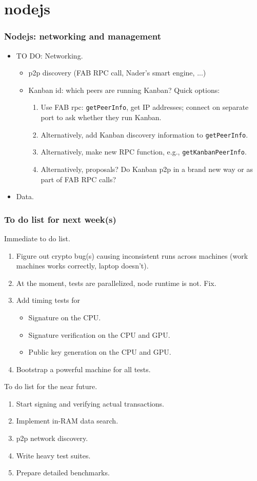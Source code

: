 \section{nodejs}
\begin{frame}[fragile]
\frametitle{Nodejs: networking and management}
\begin{itemize}
\item TO DO: Networking.
\begin{itemize}
\item p2p discovery (FAB RPC call, Nader's smart engine, ...)
\item Kanban id: which peers are running Kanban? Quick options:
\begin{enumerate}
\item Use FAB rpc: \verb|getPeerInfo|, get IP addresses; connect on separate port to ask whether they run Kanban.
\item Alternatively, add Kanban discovery information to \verb|getPeerInfo|.
\item Alternatively, make new RPC function, e.g., \verb|getKanbanPeerInfo|.
\item Alternatively, proposals? Do Kanban p2p in a brand new way or as part of FAB RPC calls?
\end{enumerate}
\end{itemize} 
\item Data.
\end{itemize}
\end{frame}
\begin{frame}
\frametitle{To do list for next week(s)}
Immediate to do list.
\begin{enumerate}
\item Figure out crypto bug(s) causing inconsistent runs across machines (work machines works correctly, laptop doesn't). 
\item At the moment, tests are parallelized, node runtime is not. Fix. 
\item Add timing tests for 
\begin{itemize}
\item Signature on the CPU.
\item Signature verification on the CPU and GPU.
\item Public key generation on the CPU and GPU.
\end{itemize}
\item Bootstrap a powerful machine for all tests.
\end{enumerate}

To do list for the near future.

\begin{enumerate}
\item Start signing and verifying actual transactions.
\item Implement in-RAM data search.
\item p2p network discovery.
\item Write heavy test suites.
\item Prepare detailed benchmarks.
\end{enumerate}
\end{frame}